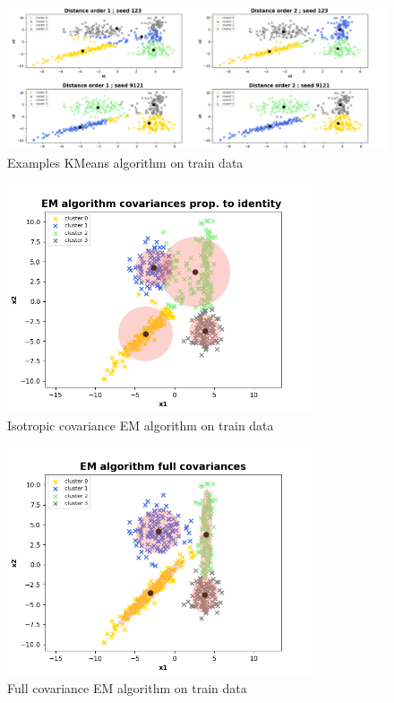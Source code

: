 \documentclass[a4paper, 11pt]{article}
\begin{document}
\clearpage

\begin{figure}[!h]
  \centering
  \includegraphics[width=18cm]{kmeans.png}
  \caption{Examples KMeans algorithm on train data}
  \label{fig:kmeans}
\end{figure}

\begin{figure}[!h]
  \centering
  \includegraphics[width=9cm]{em_iso.png}
  \caption{Isotropic covariance EM algorithm on train data}
  \label{fig:em_iso}
\end{figure}

\begin{figure}[!h]
  \centering
  \includegraphics[width=9cm]{em_full.png}
  \caption{Full covariance EM algorithm on train data}
  \label{fig:em_full}
\end{figure}
\end{document}
